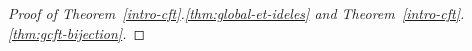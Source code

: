 \begin{proof}[Proof of Theorem~\ref{intro-cft}.\ref{thm:global-et-ideles} and Theorem~\ref{intro-cft}.\ref{thm:gcft-bijection}]
%

\end{proof}
